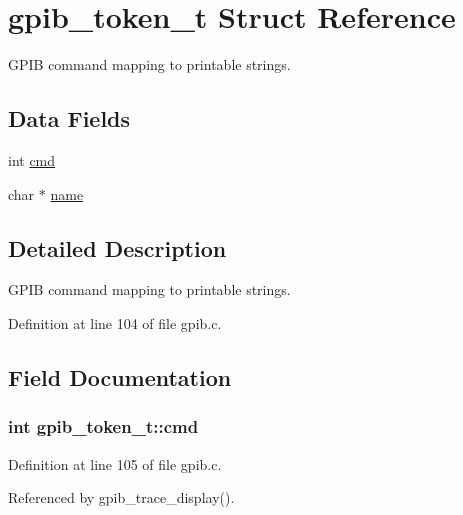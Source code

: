 \hypertarget{structgpib__token__t}{}\section{gpib\+\_\+token\+\_\+t Struct Reference}
\label{structgpib__token__t}


G\+P\+IB command mapping to printable strings.  


\subsection*{Data Fields}
\begin{DoxyCompactItemize}
\item 
int \hyperlink{structgpib__token__t_a8bc698b3cba149e3abbf935e623775c0}{cmd}
\item 
char $\ast$ \hyperlink{structgpib__token__t_aa47fb36b52bd83dc60e67a54f6e36e09}{name}
\end{DoxyCompactItemize}


\subsection{Detailed Description}
G\+P\+IB command mapping to printable strings. 

Definition at line 104 of file gpib.\+c.



\subsection{Field Documentation}
\subsubsection[{\texorpdfstring{cmd}{cmd}}]{\setlength{\rightskip}{0pt plus 5cm}int gpib\+\_\+token\+\_\+t\+::cmd}\hypertarget{structgpib__token__t_a8bc698b3cba149e3abbf935e623775c0}{}\label{structgpib__token__t_a8bc698b3cba149e3abbf935e623775c0}


Definition at line 105 of file gpib.\+c.



Referenced by gpib\+\_\+trace\+\_\+display().

